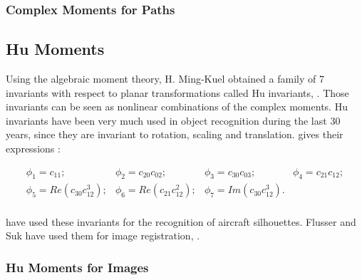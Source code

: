 \subsubsection{Complex Moments for Paths}


\subsection{Hu Moments}
\label{sec:HuMoments}
Using the algebraic moment theory, H. Ming-Kuel obtained a family of 7
invariants with respect to planar transformations called Hu invariants,
\cite{hu}. Those invariants can be seen as nonlinear combinations of
the complex moments. Hu invariants have
been very much used in object recognition during the last 30 years,
since they are invariant to rotation, scaling and translation. \cite{flusserinv} gives their expressions :

\begin{equation}
\begin{array}{cccc}
\phi_1 = c_{11};& \phi_2 = c_{20}c_{02};& \phi_3 = c_{30}c_{03};& \phi_4 = c_{21}c_{12};\\
\phi_5 = Re(c_{30}c_{12}^3);& \phi_6 = Re(c_{21}c_{12}^2);& \phi_7 = Im(c_{30}c_{12}^3).&\\
\end{array}
\end{equation}


\cite{dudani} have used these invariants for the recognition of
aircraft silhouettes. Flusser and Suk have used them for image
registration, \cite{flusser_2}.

\subsubsection{Hu Moments for Images}

%


